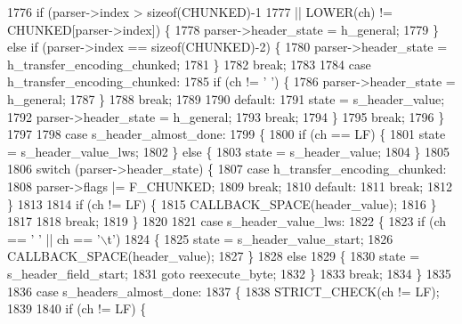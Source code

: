 \begin{DoxyCode}
1776             \textcolor{keywordflow}{if} (parser->index > \textcolor{keyword}{sizeof}(CHUNKED)-1
1777                 || LOWER(ch) != CHUNKED[parser->index]) \{
1778               parser->header_state = h_general;
1779             \} \textcolor{keywordflow}{else} \textcolor{keywordflow}{if} (parser->index == \textcolor{keyword}{sizeof}(CHUNKED)-2) \{
1780               parser->header_state = h_transfer_encoding_chunked;
1781             \}
1782             \textcolor{keywordflow}{break};
1783 
1784           \textcolor{keywordflow}{case} h_transfer_encoding_chunked:
1785             \textcolor{keywordflow}{if} (ch != \textcolor{charliteral}{' '}) \{
1786               parser->header_state = h_general;
1787             \}
1788             \textcolor{keywordflow}{break};
1789 
1790           \textcolor{keywordflow}{default}:
1791             state = s_header_value;
1792             parser->header_state = h_general;
1793             \textcolor{keywordflow}{break};
1794         \}
1795         \textcolor{keywordflow}{break};
1796       \}
1797 
1798       \textcolor{keywordflow}{case} s_header_almost_done:
1799       \{
1800         \textcolor{keywordflow}{if} (ch == LF) \{
1801           state = s_header_value_lws;
1802         \} \textcolor{keywordflow}{else} \{
1803           state = s_header_value;
1804         \}
1805 
1806         \textcolor{keywordflow}{switch} (parser->header_state) \{
1807           \textcolor{keywordflow}{case} h_transfer_encoding_chunked:
1808             parser->flags |= F_CHUNKED;
1809             \textcolor{keywordflow}{break};
1810           \textcolor{keywordflow}{default}:
1811             \textcolor{keywordflow}{break};
1812         \}
1813 
1814         \textcolor{keywordflow}{if} (ch != LF) \{
1815           CALLBACK_SPACE(header\_value);
1816         \}
1817 
1818         \textcolor{keywordflow}{break};
1819       \}
1820 
1821       \textcolor{keywordflow}{case} s_header_value_lws:
1822       \{
1823         \textcolor{keywordflow}{if} (ch == \textcolor{charliteral}{' '} || ch == \textcolor{charliteral}{'\(\backslash\)t'})
1824         \{
1825           state = s_header_value_start;
1826           CALLBACK_SPACE(header\_value);
1827         \}
1828         \textcolor{keywordflow}{else}
1829         \{
1830           state = s_header_field_start;
1831           \textcolor{keywordflow}{goto} reexecute\_byte;
1832         \}
1833         \textcolor{keywordflow}{break};
1834       \}
1835 
1836       \textcolor{keywordflow}{case} s_headers_almost_done:
1837       \{
1838         STRICT_CHECK(ch != LF);
1839 
1840         \textcolor{keywordflow}{if} (ch != LF) \{

\end{DoxyCode}
